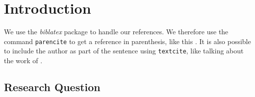\chapter{Introduction}

We use the \emph{biblatex} package to handle our references.  We therefore use the
command \texttt{parencite} to get a reference in parenthesis, like this
\parencite[12]{Pizzolato2015}\cite{Pizzolato2015}.  It is also possible to include the author
as part of the sentence using \texttt{textcite}, like talking about
the work of \textcite{Lloyd2003}.

\Blindtext

\section{Research Question}
\blindtext